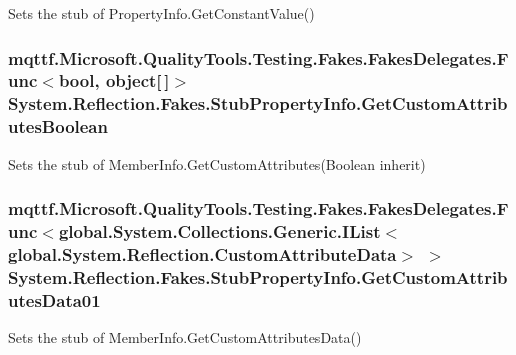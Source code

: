 Sets the stub of Property\-Info.\-Get\-Constant\-Value()

\hypertarget{class_system_1_1_reflection_1_1_fakes_1_1_stub_property_info_a36a643d8823b52ff6de3f6f61108a476}{
\subsubsection[{Get\-Custom\-Attributes\-Boolean}]{\setlength{\rightskip}{0pt plus 5cm}mqttf.\-Microsoft.\-Quality\-Tools.\-Testing.\-Fakes.\-Fakes\-Delegates.\-Func$<$bool, object\mbox{[}$\,$\mbox{]}$>$ System.\-Reflection.\-Fakes.\-Stub\-Property\-Info.\-Get\-Custom\-Attributes\-Boolean}}\label{class_system_1_1_reflection_1_1_fakes_1_1_stub_property_info_a36a643d8823b52ff6de3f6f61108a476}


Sets the stub of Member\-Info.\-Get\-Custom\-Attributes(\-Boolean inherit)

\hypertarget{class_system_1_1_reflection_1_1_fakes_1_1_stub_property_info_a132e615b5abd8c9e23b8499a25e6586f}{
\subsubsection[{Get\-Custom\-Attributes\-Data01}]{\setlength{\rightskip}{0pt plus 5cm}mqttf.\-Microsoft.\-Quality\-Tools.\-Testing.\-Fakes.\-Fakes\-Delegates.\-Func$<$global.\-System.\-Collections.\-Generic.\-I\-List$<$global.\-System.\-Reflection.\-Custom\-Attribute\-Data$>$ $>$ System.\-Reflection.\-Fakes.\-Stub\-Property\-Info.\-Get\-Custom\-Attributes\-Data01}}\label{class_system_1_1_reflection_1_1_fakes_1_1_stub_property_info_a132e615b5abd8c9e23b8499a25e6586f}


Sets the stub of Member\-Info.\-Get\-Custom\-Attributes\-Data()

